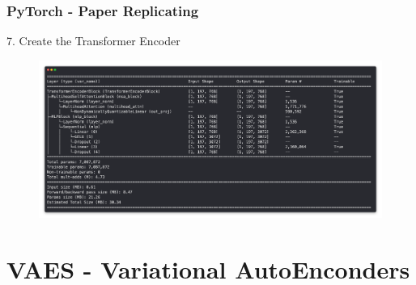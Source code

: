 \documentclass{beamer}
\begin{document}
\begin{frame}
	\frametitle{PyTorch - Paper Replicating}
	\begin{block}{7. Create the Transformer Encoder}
		\begin{figure}
			\centering
			\includegraphics[width=1\linewidth]{figures/final_model}
		\end{figure}
		
		
	\end{block}
\end{frame}
\section{VAES - Variational AutoEnconders}
\end{document}
